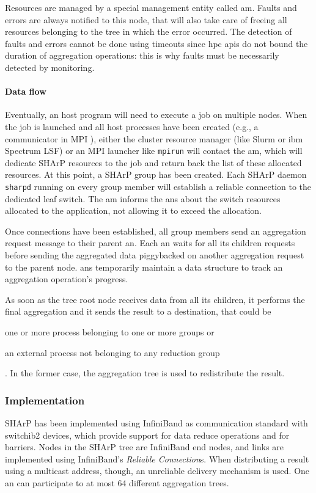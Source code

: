Resources are managed by a special management entity called \gls{am}.
Faults and errors are always notified to this node, that will also take care of freeing all resources belonging to the tree in which the error occurred.
The detection of faults and errors cannot be done using timeouts since \gls{hpc} \glspl{api} do not bound the duration of aggregation operations: this is why faults must be necessarily detected by monitoring.

\paragraph{Data flow}
Eventually, an host program will need to execute a job on multiple nodes.
When the job is launched and all host processes have been created (e.g., a communicator in MPI \cite{mpi}), either the cluster resource manager (like Slurm \cite{slurm} or \glsdesc{ibm} Spectrum LSF) or an MPI \cite{mpi} launcher like \texttt{mpirun} will contact the \gls{am}, which will dedicate SHArP \cite{sharp} resources to the job and return back the list of these allocated resources.
At this point, a SHArP \cite{sharp} group has been created.
Each SHArP \cite{sharp} daemon \texttt{sharpd} running on every group member will establish a reliable connection to the dedicated leaf switch.
The \gls{am} informs the \glspl{an} about the switch resources allocated to the application, not allowing it to exceed the allocation.\par
Once connections have been established, all group members send an aggregation request message to their parent \gls{an}.
Each \gls{an} waits for all its children requests before sending the aggregated data piggybacked on another aggregation request to the parent node.
\glspl{an} temporarily maintain a data structure to track an aggregation operation's progress.\par
As soon as the tree root node receives data from all its children, it performs the final aggregation and it sends the result to a destination, that could be
\begin{mylist}
    \item one or more process belonging to one or more groups or
    \item an external process not belonging to any reduction group
\end{mylist}.
In the former case, the aggregation tree is used to redistribute the result.

\subsubsection{Implementation}
SHArP \cite{sharp} has been implemented using InfiniBand \cite{infiniband} as communication standard with \glsdesc{switchib2} devices, which provide support for data reduce operations and for barriers.
Nodes in the SHArP \cite{sharp} tree are InfiniBand \cite{infiniband} end nodes, and links are implemented using InfiniBand's \cite{infiniband} \textit{Reliable Connection}s.
When distributing a result using a multicast address, though, an unreliable delivery mechanism is used.
One \gls{an} can participate to at most 64 different aggregation trees.

